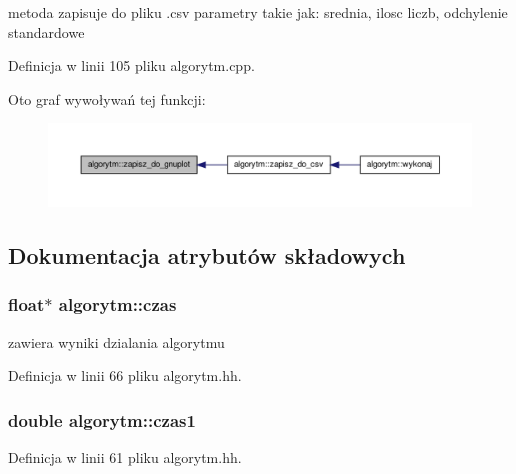 metoda zapisuje do pliku .csv parametry takie jak\-: srednia, ilosc liczb, odchylenie standardowe 



\-Definicja w linii 105 pliku algorytm.\-cpp.



\-Oto graf wywoływań tej funkcji\-:
\nopagebreak
\begin{figure}[H]
\begin{center}
\leavevmode
\includegraphics[width=350pt]{classalgorytm_ad2051f4366b78a7c73adc8b3418a495c_icgraph}
\end{center}
\end{figure}




\subsection{\-Dokumentacja atrybutów składowych}
\hypertarget{classalgorytm_a8005d5f3266848b756400e3bb189de58}{
\subsubsection[{czas}]{\setlength{\rightskip}{0pt plus 5cm}float$\ast$ {\bf algorytm\-::czas}}}\label{classalgorytm_a8005d5f3266848b756400e3bb189de58}


zawiera wyniki dzialania algorytmu 



\-Definicja w linii 66 pliku algorytm.\-hh.

\hypertarget{classalgorytm_a4dae8e390930e55b11f9e0f4efd9edaf}{
\subsubsection[{czas1}]{\setlength{\rightskip}{0pt plus 5cm}double {\bf algorytm\-::czas1}}}\label{classalgorytm_a4dae8e390930e55b11f9e0f4efd9edaf}


\-Definicja w linii 61 pliku algorytm.\-hh.

